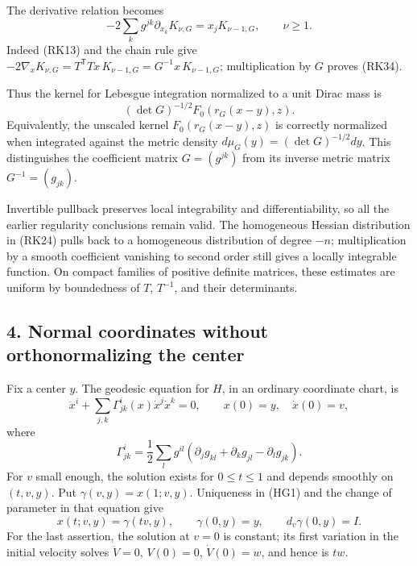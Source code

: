\documentclass[
  11pt,
]{article}
\begin{document}
The derivative relation becomes \[
 -2\sum_k g^{jk}\partial_{x_k}K_{\nu,G}
 =x_jK_{\nu-1,G},\qquad \nu\geq1.
 \tag{RK34}
\] Indeed (RK13) and the chain rule give
\(-2\nabla_xK_{\nu,G}=T^{\mathsf T}Tx\,K_{\nu-1,G}
=G^{-1}x\,K_{\nu-1,G}\); multiplication by \(G\) proves (RK34).

Thus the kernel for Lebesgue integration normalized to a unit Dirac mass
is \[
 (\det G)^{-1/2}F_0(r_G(x-y),z).
 \tag{RK35}
\] Equivalently, the unscaled kernel \(F_0(r_G(x-y),z)\) is correctly
normalized when integrated against the metric density
\(d\mu_G(y)=(\det G)^{-1/2}dy\). This distinguishes the coefficient
matrix \(G=(g^{jk})\) from its inverse metric matrix
\(G^{-1}=(g_{jk})\).

Invertible pullback preserves local integrability and differentiability,
so all the earlier regularity conclusions remain valid. The homogeneous
Hessian distribution in (RK24) pulls back to a homogeneous distribution
of degree \(-n\); multiplication by a smooth coefficient vanishing to
second order still gives a locally integrable function. On compact
families of positive definite matrices, these estimates are uniform by
boundedness of \(T\), \(T^{-1}\), and their determinants.

\subsection{4. Normal coordinates without orthonormalizing the
center}\label{normal-coordinates-without-orthonormalizing-the-center}

Fix a center \(y\). The geodesic equation for \(H\), in an ordinary
coordinate chart, is \[
 \ddot x^i+\sum_{j,k}\Gamma^i_{jk}(x)\dot x^j\dot x^k=0,
 \qquad x(0)=y,\quad\dot x(0)=v,                               \tag{HG1}
\] where \[
 \Gamma^i_{jk}=\frac12\sum_l g^{il}
             (\partial_jg_{kl}+\partial_kg_{jl}-\partial_lg_{jk}).
                                                                    \tag{HG2}
\] For \(v\) small enough, the solution exists for \(0\leq t\leq1\) and
depends smoothly on \((t,v,y)\). Put \(\gamma(v,y)=x(1;v,y)\).
Uniqueness in (HG1) and the change of parameter in that equation give \[
 x(t;v,y)=\gamma(tv,y),\qquad
 \gamma(0,y)=y,\qquad d_v\gamma(0,y)=I.                         \tag{HG3}
\] For the last assertion, the solution at \(v=0\) is constant; its
first variation in the initial velocity solves \(\ddot V=0\),
\(V(0)=0\), \(\dot V(0)=w\), and hence is \(tw\).
\end{document}
